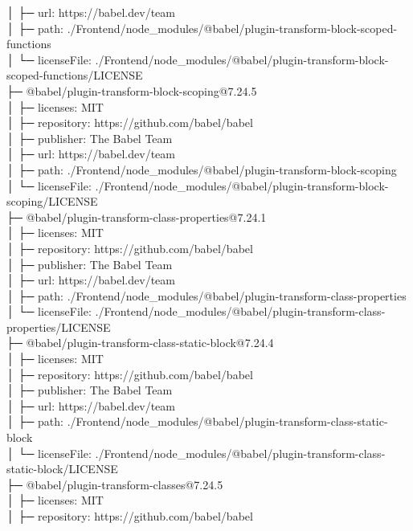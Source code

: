 \documentclass[
    paper=a4,
    twoside=false,
    parskip=half,
    listof=entryprefix,
    listof=totoc,
    index=totoc,
    bibliography=totoc,
    headsepline,
]{scrbook}
\begin{document}
    │  ├─ url: https://babel.dev/team\\
    │  ├─ path: ./Frontend/node\_modules/@babel/plugin-transform-block-scoped-functions\\
    │  └─ licenseFile: ./Frontend/node\_modules/@babel/plugin-transform-block-scoped-functions/LICENSE\\
    ├─ @babel/plugin-transform-block-scoping@7.24.5\\
    │  ├─ licenses: MIT\\
    │  ├─ repository: https://github.com/babel/babel\\
    │  ├─ publisher: The Babel Team\\
    │  ├─ url: https://babel.dev/team\\
    │  ├─ path: ./Frontend/node\_modules/@babel/plugin-transform-block-scoping\\
    │  └─ licenseFile: ./Frontend/node\_modules/@babel/plugin-transform-block-scoping/LICENSE\\
    ├─ @babel/plugin-transform-class-properties@7.24.1\\
    │  ├─ licenses: MIT\\
    │  ├─ repository: https://github.com/babel/babel\\
    │  ├─ publisher: The Babel Team\\
    │  ├─ url: https://babel.dev/team\\
    │  ├─ path: ./Frontend/node\_modules/@babel/plugin-transform-class-properties\\
    │  └─ licenseFile: ./Frontend/node\_modules/@babel/plugin-transform-class-properties/LICENSE\\
    ├─ @babel/plugin-transform-class-static-block@7.24.4\\
    │  ├─ licenses: MIT\\
    │  ├─ repository: https://github.com/babel/babel\\
    │  ├─ publisher: The Babel Team\\
    │  ├─ url: https://babel.dev/team\\
    │  ├─ path: ./Frontend/node\_modules/@babel/plugin-transform-class-static-block\\
    │  └─ licenseFile: ./Frontend/node\_modules/@babel/plugin-transform-class-static-block/LICENSE\\
    ├─ @babel/plugin-transform-classes@7.24.5\\
    │  ├─ licenses: MIT\\
    │  ├─ repository: https://github.com/babel/babel\\
\end{document}
